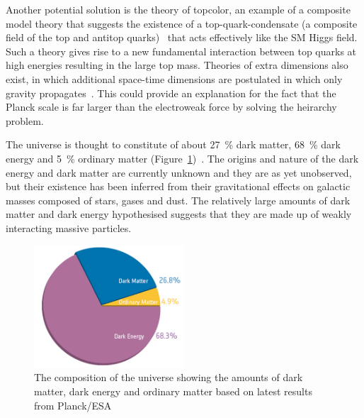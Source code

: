 Another potential solution is the theory of topcolor, an example of a composite model theory that suggests the
existence of a top-quark-condensate (a composite field of the top and antitop
quarks)~\cite{1990PhRvD..41.1647B,1991PhLB..266..419H} that acts effectively like the SM Higgs field. Such a
theory gives rise to a new fundamental interaction between top quarks at high energies resulting in the large
top mass. Theories of extra dimensions also exist, in which additional space-time dimensions are postulated in
which only gravity propagates~\cite{ArkaniHamed:1998rs}.
This could provide an explanation for the fact that the Planck scale is far larger than the electroweak force
by solving the heirarchy problem.

The universe is thought to constitute of about 27~\% dark matter, 68~\% dark energy and 5~\% ordinary
matter (Figure~\ref{fig:universe_composition})~\cite{Ade:2013sjv}. The origins and nature of the dark energy and dark
matter are currently unknown and they are as yet unobserved, but their existence has been inferred from their
gravitational effects on galactic masses composed of stars, gases and dust. The relatively large amounts of
dark matter and dark energy hypothesised suggests that they are made up of weakly interacting massive
particles.

\begin{figure}[hbtp]
   \centering
     \includegraphics[width=0.5\textwidth]{Chapters/03_Theory/Images/planck_cosmic_pie}\hfill
     \caption[The composition of the universe showing the amounts of dark matter, dark energy and ordinary
     matter.]{The composition of the universe showing the amounts of dark matter, dark energy and ordinary
     matter based on latest results from Planck/ESA~\cite{Ade:2013sjv}}
     \label{fig:universe_composition}
\end{figure}
